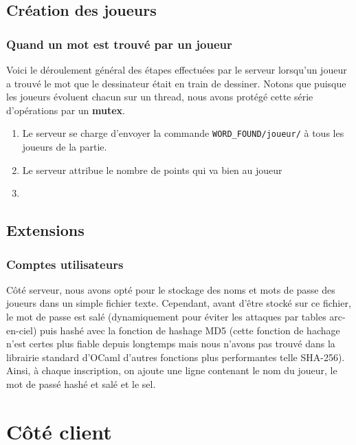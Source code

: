 \documentclass[a4paper, 11pt]{article}
\begin{document}
\subsection {Création des joueurs}

\subsubsection {Quand un mot est trouvé par un joueur}

Voici le déroulement général des étapes effectuées par le serveur
lorsqu’un joueur a trouvé le mot que le dessinateur était en train de
dessiner. Notons que puisque les joueurs évoluent chacun sur un
thread, nous avons protégé cette série d’opérations par un
\textbf{mutex}.

\begin{enumerate}
\item Le serveur se charge d’envoyer la commande
  \verb+WORD_FOUND/joueur/+ à tous les joueurs de la partie.
\item Le serveur attribue le nombre de points qui va bien au joueur
\item 
\end{enumerate}

\subsection {Extensions}

\subsubsection {Comptes utilisateurs}

Côté serveur, nous avons opté pour le stockage des noms et mots de
passe des joueurs dans un simple fichier texte. Cependant, avant
d'être stocké sur ce fichier, le mot de passe est salé (dynamiquement
pour éviter les attaques par tables arc-en-ciel) puis hashé avec la
fonction de hashage MD5 (cette fonction de hachage n'est certes plus
fiable depuis longtemps mais nous n’avons pas trouvé dans la librairie
standard d'OCaml d’autres fonctions plus performantes telle SHA-256).
Ainsi, à chaque inscription, on ajoute une ligne contenant le nom du
joueur, le mot de passé hashé et salé et le sel.

\section{Côté client}
\end{document}
